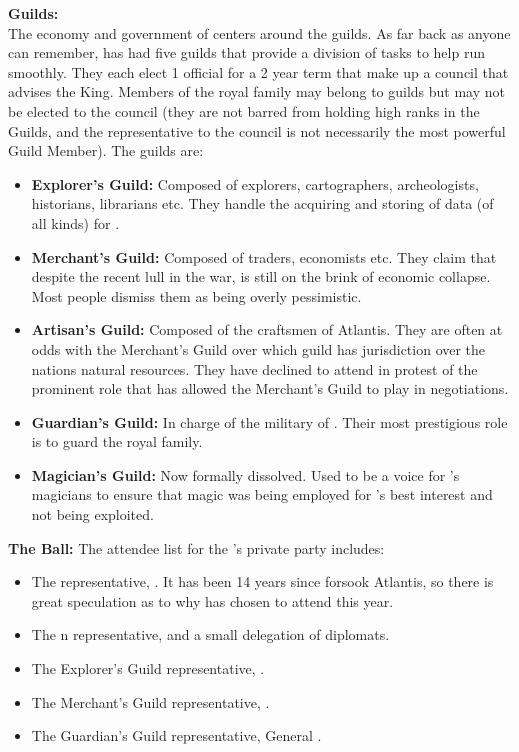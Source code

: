 \documentclass[blue]{NeptuneBall}
\begin{document}
{\bf Guilds:}\\
The economy and government of \pAtlantis{} centers around the guilds. As far back as anyone can remember, \pAtlantis{} has had five guilds that provide a division of tasks to help \pAtlantis{} run smoothly. They each elect 1 official for a 2 year term that make up a council that advises the King.  Members of the royal family may belong to guilds but may not be elected to the council (they are not barred from holding high ranks in the Guilds, and the representative to the council is not necessarily the most powerful Guild Member). The guilds are:
\begin{itemize}
  \item {\bf Explorer's Guild:} Composed of explorers, cartographers, archeologists, historians, librarians etc. They handle the acquiring and storing of data (of all kinds) for \pAtlantis{}.
  \item{\bf Merchant's Guild:} Composed of traders, economists etc. They claim that despite the recent lull in the war, \pAtlantis{} is  still on the brink of economic collapse. Most people dismiss them as being overly pessimistic.
  \item {\bf Artisan's Guild:} Composed of the craftsmen of Atlantis. They are often at odds with the Merchant's Guild over which guild has jurisdiction over the nations natural resources. They have declined to attend in protest of the prominent role that \cKing{\King} \cKing{} has allowed the Merchant's Guild to play in negotiations.
  \item {\bf Guardian's Guild:} In charge of the military of \pAtlantis{}. Their most prestigious role is to guard the royal family.
  \item {\bf Magician's Guild:}  Now formally dissolved. Used to be a voice for \pAtlantis{}'s magicians to ensure that magic was being employed for \pAtlantis{}'s best interest and not being exploited.
\end{itemize}

{\bf The \cExExKing{} Ball:}
The attendee list for the \cKing{\King}'s private party includes:
\begin{itemize}
  \item The \pAmerica{} representative, \cAriel{\King} \cAriel{}. It has been 14 years since \cAriel{\MYname{}} forsook Atlantis, so there is great speculation as to why \cAriel{\they} has chosen to attend this year.
  \item The \pPacifica{}n representative, \cPrince{\Prince} \cPrince{} and a small delegation of diplomats.
  \item The Explorer's Guild representative, \cPlant{\Prince} \cPlant{}.
  \item The Merchant's Guild representative, \cSlave{}.
  \item The Guardian's Guild representative, General \cGeneral{}.
\end{itemize}
\end{document}
